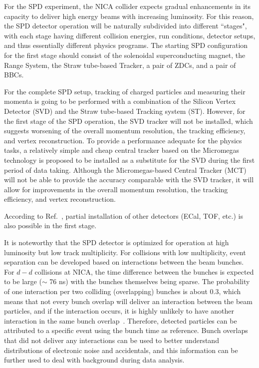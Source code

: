  

For the SPD experiment, the NICA collider expects gradual enhancements in its capacity to deliver high energy beams with increasing luminosity. For this reason, the SPD detector operation will be naturally subdivided into different ``stages", with each stage having different collision energies, run conditions, detector setups, and thus essentially different physics programs\cite{TDR_SPD,SPDproto:2021hnm,SPD_1st_stage,Arbuzov:2020cqg}. The starting SPD configuration for the first stage should consist of the solenoidal superconducting magnet, the Range System, the Straw tube-based Tracker, a pair of ZDCs, and a pair of BBCs\cite{TDR_SPD,SPD_1st_stage}. 


For the complete SPD setup, tracking of charged particles and measuring their momenta is going to be performed with a combination of the Silicon Vertex Detector (SVD) and the Straw tube-based Tracking system (ST). However, for the first stage of the SPD operation, the SVD tracker will not be installed, which suggests worsening of the overall momentum resolution, the tracking efficiency, and vertex reconstruction. To provide a performance adequate for the physics tasks, a relatively simple and cheap central tracker based on the Micromegas technology is proposed to be installed as a substitute for the SVD during the first period of data taking. Although the Micromegas-based Central Tracker (MCT) will not be able to provide the accuracy comparable with the SVD tracker, it will allow for improvements in the overall momentum resolution, the tracking efficiency, and vertex reconstruction\cite{TDR_SPD}.


According to Ref.~\cite{TDR_SPD}, partial installation of other detectors (ECal, TOF, etc.) is also possible in the first stage.


It is noteworthy that the SPD detector is optimized for operation at high luminosity but low track multiplicity\cite{TDR_SPD}. For collisions with low multiplicity, event separation can be developed based on interactions between the beam bunches. For $d-d$ collisions at NICA, the time difference between the bunches is expected to be large ($\sim$ 76 ns) with the bunches themselves being sparse. The probability of one interaction per two colliding (overlapping) bunches is about 0.3, which means that not every bunch overlap will deliver an interaction between the beam particles, and if the interaction occurs, it is highly unlikely to have another interaction in the same bunch overlap~\cite{TDR_SPD}. Therefore, detected particles can be attributed to a specific event using the bunch time as reference. Bunch overlaps that did not deliver any interactions can be used to better understand distributions of electronic noise and accidentals, and this information can be further used to deal with background during data analysis. 




